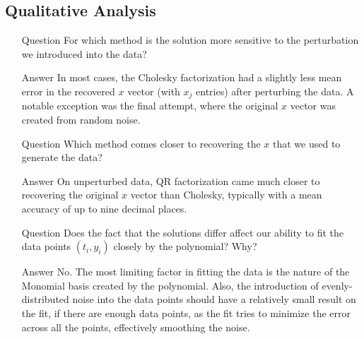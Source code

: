 \documentclass[paper=a4, fontsize=11pt]{scrartcl}
\numberwithin{equation}{section}		%
\numberwithin{figure}{section}			%
\numberwithin{table}{section}				%
\begin{document}
\vspace{4mm}
\subsection{Qualitative Analysis}

\begin{enumerate}[(a)]
	\item[Question] For which method is the solution more sensitive to the perturbation we introduced into the data? \vspace{-2mm}
		\item[Answer] In most cases, the Cholesky factorization had a slightly less mean error in the recovered $x$ vector (with $x_j$ entries) after perturbing the data. A notable exception was the final attempt, where the original $x$ vector was created from random noise.
	\item[Question] Which method comes closer to recovering the $x$ that we used to generate the data? \vspace{-2mm}
		\item[Answer] On unperturbed data, QR factorization came much closer to recovering the original $x$ vector than Cholesky, typically with a mean accuracy of up to nine decimal places.
	\item[Question] Does the fact that the solutions differ affect our ability to fit the data points $(t_i, y_i)$ closely by the polynomial? Why? \vspace{-2mm}
		\item[Answer] No. The most limiting factor in fitting the data is the nature of the Monomial basis created by the polynomial. Also, the introduction of evenly-distributed noise into the data points should have a relatively small result on the fit, if there are enough data points, as the fit tries to minimize the error across all the points, effectively smoothing the noise.
\end{enumerate}

\vspace{4mm}
\end{document}
